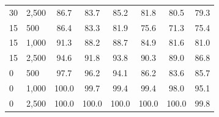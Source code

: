 \documentclass{article}\usepackage[]{graphicx}\usepackage[]{xcolor}
\newenvironment{knitrout}{}{} %
\begin{document}
\begin{knitrout}
\begin{landscape}
\begin{longtable}[t]{llcccccc}
\hspace{1em}30 & 2,500 & 86.7 & 83.7 & 85.2 & 81.8 & 80.5 & 79.3\\
\hspace{1em}15 & 500 & 86.4 & 83.3 & 81.9 & 75.6 & 71.3 & 75.4\\
\hspace{1em}15 & 1,000 & 91.3 & 88.2 & 88.7 & 84.9 & 81.6 & 81.0\\
\hspace{1em}15 & 2,500 & 94.6 & 91.8 & 93.8 & 90.3 & 89.0 & 86.8\\
\hspace{1em}0 & 500 & 97.7 & 96.2 & 94.1 & 86.2 & 83.6 & 85.7\\
\hspace{1em}0 & 1,000 & 100.0 & 99.7 & 99.4 & 99.4 & 98.0 & 95.1\\
\hspace{1em}0 & 2,500 & 100.0 & 100.0 & 100.0 & 100.0 & 100.0 & 99.8\\*
\end{longtable}
\end{landscape}

\end{knitrout}

\vskip 0.2in


\end{document}
